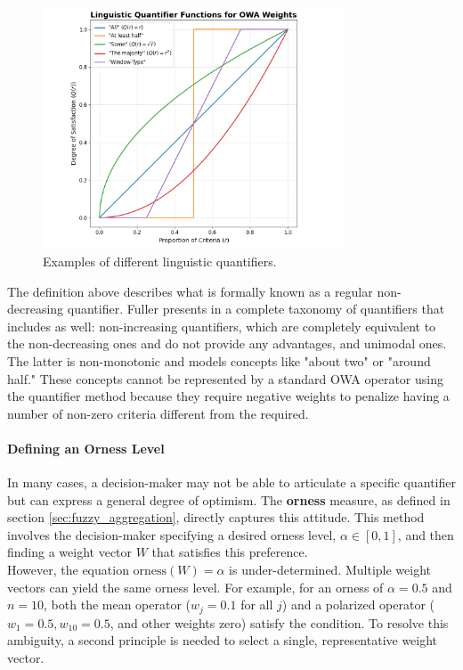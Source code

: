 \begin{figure}[!ht]
    \centering
    \includegraphics[width=0.8\textwidth]{ch2/figures/Quantifiers_examples.png}
    \caption{Examples of different linguistic quantifiers.}
    \label{fig:quantifier_examples}
\end{figure}
    

The definition above describes what is formally known as a regular non-decreasing quantifier. Fuller presents in \cite[ch.~2]{FULLER2} a complete taxonomy of quantifiers that includes as well: non-increasing quantifiers, which are completely equivalent to the non-decreasing ones and do not provide any advantages, and unimodal ones. The latter is non-monotonic and models concepts like "about two" or "around half." These concepts cannot be represented by a standard OWA operator using the quantifier method because they require negative weights to penalize having a number of non-zero criteria different from the required. 


\paragraph{Defining an Orness Level}

In many cases, a decision-maker may not be able to articulate a specific quantifier but can express a general degree of optimism. The \textbf{orness} measure, as defined in section \ref{sec:fuzzy_aggregation}, directly captures this attitude. This method involves the decision-maker specifying a desired orness level, $\alpha \in [0, 1]$, and then finding a weight vector $W$ that satisfies this preference.\\

However, the equation $\text{orness}(W) = \alpha$ is under-determined. Multiple weight vectors can yield the same orness level. For example, for an orness of $\alpha = 0.5$ and $n=10$, both the mean operator ($w_j = 0.1$ for all $j$) and a polarized operator ($w_1 = 0.5, w_{10} = 0.5$, and other weights zero) satisfy the condition. To resolve this ambiguity, a second principle is needed to select a single, representative weight vector.

